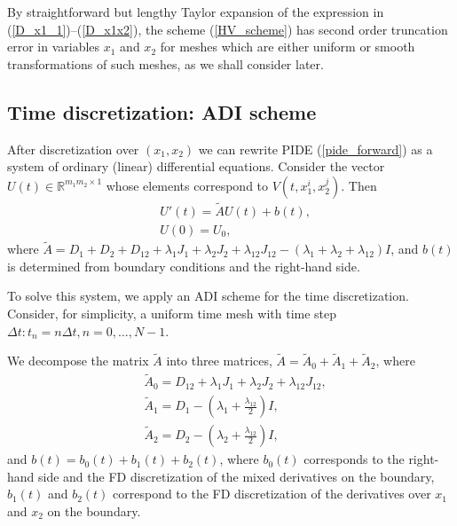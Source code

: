 {By straightforward but lengthy Taylor expansion of the expression in (\ref{D_x1_1})--(\ref{D_x1x2}), the scheme (\ref{HV_scheme}) has  second order truncation error in variables $x_1$ and $x_2$ for meshes which are either uniform or smooth transformations of such meshes, as we shall consider later.

\subsection{Time discretization: ADI scheme}
After discretization over $(x_1, x_2)$ we can rewrite PIDE (\ref{pide_forward}) as a system of ordinary (linear) differential equations. Consider the vector $U(t) \in \mathbb{R}^{m_1m_2 \times 1}$ whose elements correspond to $V(t, x_1^i, x_2^j)$. Then
\begin{equation}
	\begin{aligned}
		& U'(t) = \tilde{A} U(t) + b(t), \\
		& U(0) = U_0,
	\end{aligned}
\end{equation}
where $\tilde{A} = D_1 + D_2 + D_{12} + \lambda_1 J_1 + \lambda_2 J_2 + \lambda_{12} J_{12} - (\lambda_1 + \lambda_2 + \lambda_{12}) I$, and $b(t)$ is determined from boundary conditions and the right-hand side.

To solve this system, we apply an ADI scheme for the time discretization. Consider, for simplicity, a uniform time mesh with time step $\Delta t: t_n = n \Delta t, n = 0, \ldots, N-1$. 

We decompose the matrix $\tilde{A}$  into three matrices, $\tilde{A} = \tilde{A}_0 + \tilde{A}_1 + \tilde{A}_2$, where
\begin{align*}
	& \tilde{A}_0 =  D_{12} + \lambda_1 J_1 + \lambda_2 J_2 + \lambda_{12} J_{12},  \\
  	& \tilde{A}_1 = D_1 - \left(\lambda_1 + \frac{\lambda_{12}}{2} \right) I, \\
	  & \tilde{A}_2 = D_2 - \left(\lambda_2 + \frac{\lambda_{12}}{2} \right) I,
\end{align*}
and $b(t) = b_0(t) + b_1(t) + b_2(t)$, where $b_0(t)$ corresponds to the right-hand side and the FD discretization of the mixed derivatives on the boundary, $b_1(t)$ and $b_2(t)$ correspond to the FD discretization of the derivatives over $x_1$ and $x_2$ on the boundary.

}
